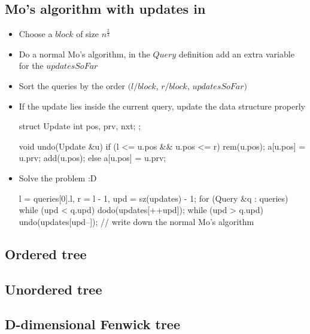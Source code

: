\subsection*{Mo's algorithm with updates in  }
  
\begin{itemize}[noitemsep]
  \item Choose a $block$ of size $n^{\frac{2}{3}}$
  \item Do a normal Mo's algorithm, in the $Query$ definition add an extra variable for the $updatesSoFar$ 
  \item Sort the queries by the order $(l /block$, $r / block$, $updatesSoFar)$
  \item If the update lies inside the current query, update the data structure properly \\
  \begin{code}
   struct Update {
     int pos, prv, nxt;
   };
  
   void undo(Update &u) {
     if (l <= u.pos && u.pos <= r) {
       rem(u.pos);
       a[u.pos] = u.prv;
       add(u.pos);
     } else {
       a[u.pos] = u.prv;
     }
   }
  \end{code}
    
  \item Solve the problem :D \\
  \begin{code}
   l = queries[0].l, r = l - 1, upd = sz(updates) - 1;
   for (Query &q : queries) {
     while (upd < q.upd)
       dodo(updates[++upd]);
     while (upd > q.upd)
       undo(updates[upd--]);
     // write down the normal Mo's algorithm
   }
  \end{code}
\end{itemize}

\subsection{Ordered tree}

\subsection{Unordered tree}

\subsection{D-dimensional Fenwick tree}


